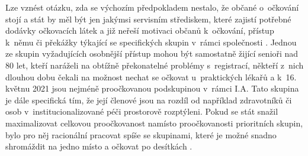 
Lze vznést otázku, zda se výchozím předpokladem nestalo, že občané o~očkování stojí a stát by měl být jen jakýmsi servisním střediskem, které zajistí potřebné dodávky očkovacích látek a již neřeší motivaci občanů k~očkování, přístup k~němu \cite{logoc_zpozdeni} či překážky týkající se specifických skupin v~rámci společnosti \cite{logoc_skvrny,logoc_romove}. %
Jednou ze skupin vyžadujících osobnější přístup mohou být samostatně žijící senioři nad 80 let, kteří naráželi na obtížně překonatelné problémy s~registrací, někteří z~nich dlouhou dobu čekali na možnost nechat se očkovat u~praktických lékařů a k~16. květnu 2021 jsou nejméně proočkovanou podskupinou v~rámci I.A. Tato skupina je dále specifická tím, že její členové jsou na rozdíl od například zdravotníků či osob v~institucionalizované péči prostorově rozptýleni. Pokud se stát snažil maximalizovat celkovou proočkovanost namísto proočkovanosti prioritních skupin, bylo pro něj racionální pracovat spíše se skupinami, které je možné snadno shromáždit na jedno místo a očkovat po desítkách \cite{blog_ucitele}.  









